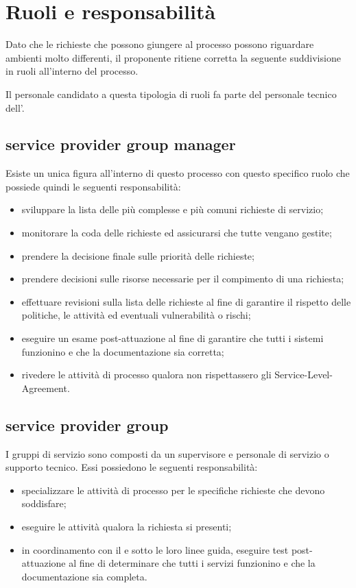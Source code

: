 %
%
\section[Ruoli e responsabilità]{Ruoli e responsabilità}
\label{rf-roles}
Dato che le richieste che possono giungere al processo possono riguardare ambienti molto differenti, il proponente ritiene corretta la seguente suddivisione in ruoli all'interno del processo.

Il personale candidato a questa tipologia di ruoli fa parte del personale tecnico dell'\entity{}.

\subsection[Service Provider Group Manager]{service provider group manager}
\label{rf-roles-spgm}
Esiste un unica figura all'interno di questo processo con questo specifico ruolo che possiede quindi le seguenti responsabilità:

\begin{itemize}
\item{sviluppare la lista delle più complesse e più comuni richieste di servizio;}
\item{monitorare la coda delle richieste ed assicurarsi che tutte vengano gestite;}
\item{prendere la decisione finale sulle priorità delle richieste;}
\item{prendere decisioni sulle risorse necessarie per il compimento di una richiesta;}
\item{effettuare revisioni sulla lista delle richieste al fine di garantire il rispetto delle politiche, le attività ed eventuali vulnerabilità o rischi;}
\item{eseguire un esame post-attuazione al fine di garantire che tutti i sistemi funzionino e che la documentazione sia corretta;}
\item{rivedere le attività di processo qualora non rispettassero gli \ac{Service-Level-Agreement}.}
\end{itemize}

\subsection[Service Provider Group]{service provider group}
\label{rf-roles-spg}
I gruppi di servizio sono composti da un supervisore e personale di servizio o supporto tecnico. Essi possiedono le seguenti responsabilità:

\begin{itemize}
\item{specializzare le attività di processo per le specifiche richieste che devono soddisfare;}
\item{eseguire le attività qualora la richiesta si presenti;}
\item{in coordinamento con il  e sotto le loro linee guida, eseguire test post-attuazione al fine di determinare che tutti i servizi funzionino e che la documentazione sia completa.}
\end{itemize}